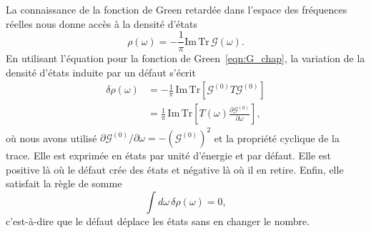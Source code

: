 La connaissance de la fonction de Green retardée dans l'espace des fréquences réelles nous donne accès à la densité d'états
\begin{equation}
    \rho(\omega) = -\frac{1}{\pi}\mathrm{Im}\,\mathrm{Tr}\,\mathcal{G}(\omega).\label{eqn:rho}
\end{equation}
En utilisant l'équation pour la fonction de Green~\eqref{eqn:G_chap}, la variation de la densité d'états induite par un défaut s'écrit
\begin{align}
    \delta\rho(\omega) &= -\frac{1}{\pi}\,\mathrm{Im}\,\mathrm{Tr}\!\left[\mathcal{G}^{(0)}T\mathcal{G}^{(0)}\right]\\
    &= \frac{1}{\pi}\,\mathrm{Im}\,\mathrm{Tr}\!\left[T(\omega)\frac{\partial\mathcal{G}^{(0)}}{\partial\omega}\right],\label{eqn:delta_rho}
\end{align}
où nous avons utilisé $\partial\mathcal{G}^{(0)}/\partial \omega = -(\mathcal{G}^{(0)})^2$ et la propriété cyclique de la trace. Elle est exprimée en états par unité d'énergie et par défaut. Elle est positive là où le défaut crée des états et négative là où il en retire. Enfin, elle satisfait la règle de somme
\begin{equation}
    \int d\omega\,\delta\rho(\omega) = 0,
\end{equation}
c'est-à-dire que le défaut déplace les états sans en changer le nombre.


